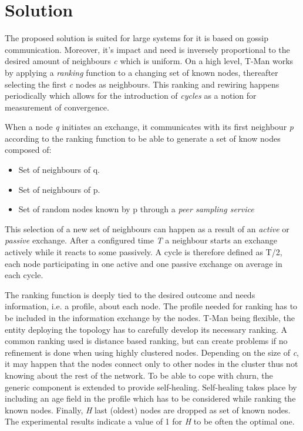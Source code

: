 \documentclass[conference]{IEEEtran}
\begin{document}
\section{Solution}
The proposed solution is suited for large systems for it is based on gossip communication.
Moreover, it's impact and need is inversely proportional to the desired amount of neighbours \emph{c} which is uniform.
On a high level, T-Man works by applying a \emph{ranking} function to a changing set of known nodes, thereafter selecting the first \emph{c} nodes as neighbours. This ranking and rewiring  happens periodically which allows for the introduction of \emph{cycles} as a notion for measurement of convergence.

When a node \emph{q} initiates an exchange, it communicates with its first neighbour \emph{p} according to the ranking function to be able to generate a set of know nodes composed of:
\begin{itemize}
    \item Set of neighbours of q.
    \item Set of neighbours of p.
    \item Set of random nodes known by p through a \emph{peer sampling service}\cite{10.1007/978-3-540-30229-2_5}
\end{itemize}
This selection of a new set of neighbours can happen as a result of an \emph{active} or \emph{passive} exchange.
After a configured time \emph{T} a neighbour starts an exchange actively while it reacts to some passively.
A cycle is therefore defined as T/2, each node participating in one active and one passive exchange on average in each cycle.

The ranking function is deeply tied to the desired outcome and needs information, i.e. a profile, about each node.
The profile needed for ranking has to be included in the information exchange by the nodes.
T-Man being flexible, the entity deploying the topology has to carefully develop its necessary ranking.
A common ranking used is distance based ranking, but can create problems if no refinement is done when using highly clustered nodes.
Depending on the size of \emph{c}, it may happen that the nodes connect only to other nodes in the cluster thus not knowing about the rest of the network.
To be able to cope with churn, the generic component is extended to provide self-healing.
Self-healing takes place by including an age field in the profile which has to be considered while ranking the known nodes.
Finally, \emph{H} last (oldest) nodes are dropped as set of known nodes.
The experimental results indicate a value of 1 for \emph{H} to be often the optimal one.
\end{document}
